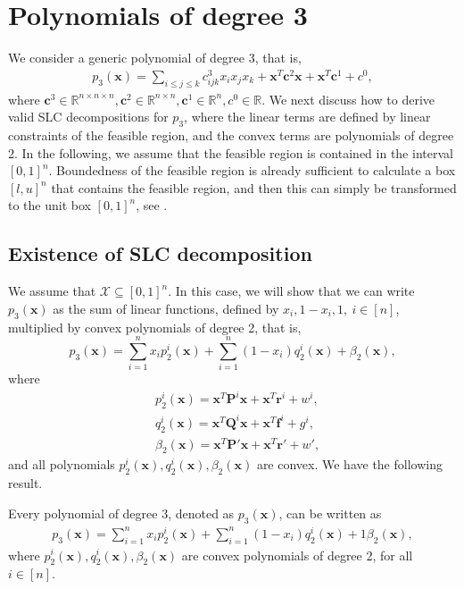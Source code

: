 \documentclass[opre,nonblindrev]{informs3} %
\begin{document}
\section{Polynomials of degree 3}  
We consider a generic polynomial of degree 3, that is,  
\begin{align*}
    p_3(\boldsymbol{x}) = \sum_{i \le j \le k} c_{ijk}^3 x_i x_j x_k + \boldsymbol{x}^T \boldsymbol{c}^2 \boldsymbol{x} + \boldsymbol{x}^T \boldsymbol{c}^1 + c^0,
\end{align*}    
where $\boldsymbol{c}^3 \in \mathbb{R}^{n \times n \times n}, \boldsymbol{c}^2 \in \mathbb{R}^{n \times n}, \boldsymbol{c}^1 \in \mathbb{R}^n, c^0 \in \mathbb{R}$. We next discuss how to derive valid SLC decompositions for $p_3$, where the linear terms are defined by linear constraints of the feasible region, and the convex terms are polynomials of degree 2. {\color{black} In the following, we assume that the feasible region is contained in the interval $[0,1]^n$. Boundedness of the feasible region is already sufficient to calculate a box $[l,u]^n$ that contains the feasible region, and then this can simply be transformed to the unit box $[0,1]^n$, see \cite{burer2009nonconvex}.} 

\subsection{Existence of SLC decomposition}
We assume that $\mathcal{X} \subseteq [0,1]^n$. In this case, we will show that we can write $p_3(\boldsymbol{x})$ as the sum of linear functions, defined by $x_i, 1-x_i, 1, \: i \in [n]$, multiplied by convex polynomials of degree 2, that is,
\begin{equation}
    p_3(\boldsymbol{x}) = \sum_{i=1}^n x_ip_2^i(\boldsymbol{x}) + \sum_{i=1}^n (1-x_i)q_2^i(\boldsymbol{x}) + \beta_2(\boldsymbol{x}), \label{eq:poly3_decomp_gen}
\end{equation}
where  
\begin{align*}
    & p_2^i(\boldsymbol{x}) = \boldsymbol{x}^T \boldsymbol{P}^i \boldsymbol{x} + \boldsymbol{x}^T \boldsymbol{r}^i + w^i, \\ 
    & q_2^i(\boldsymbol{x}) = \boldsymbol{x}^T \boldsymbol{Q}^i \boldsymbol{x} + \boldsymbol{x}^T \boldsymbol{f}^i + g^i, \\ 
    & \beta_2(\boldsymbol{x}) = \boldsymbol{x}^T \boldsymbol{P}' \boldsymbol{x} + \boldsymbol{x}^T \boldsymbol{r}' + w',
\end{align*}  
and all polynomials $p_2^i(\boldsymbol{x}), q_2^i(\boldsymbol{x}), \beta_2(\boldsymbol{x})$ are convex. We have the following result.
\begin{theorem}
\label{thm:exist_degree3}
Every polynomial of degree 3, denoted as $p_3(\boldsymbol{x})$, can be written as 
   \begin{align*}
    p_3(\boldsymbol{x}) = \sum_{i=1}^n x_ip_2^i(\boldsymbol{x}) + \sum_{i=1}^n (1-x_i)q_2^i(\boldsymbol{x}) + 1 \beta_2(\boldsymbol{x}),
\end{align*}  
where $p_2^i(\boldsymbol{x}),q_2^i(\boldsymbol{x}),\beta_2(\boldsymbol{x})$ are convex polynomials of degree 2, for all $i \in [n]$. 
\end{theorem}  
\end{document}
